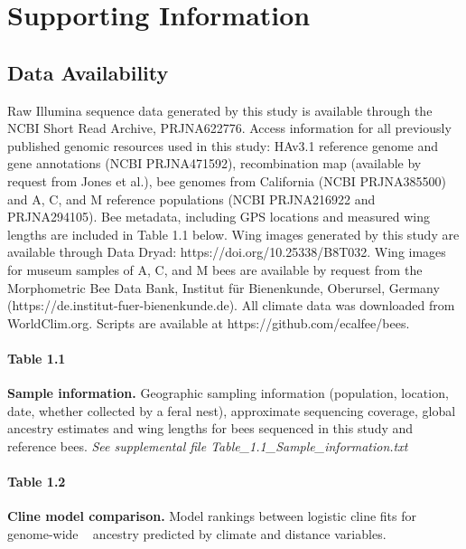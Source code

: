 \medskip

%


%

\newpage
\section*{Supporting Information}

\subsection*{Data Availability}
Raw Illumina sequence data generated by this study is available through the NCBI Short Read Archive, PRJNA622776. Access information for all previously published genomic resources used in this study: HAv3.1 reference genome and gene annotations (NCBI PRJNA471592), recombination map (available by request from Jones et al.), bee genomes from California (NCBI PRJNA385500) and A, C, and M reference populations (NCBI PRJNA216922 and PRJNA294105). Bee metadata, including GPS locations and measured wing lengths are included in Table 1.1 below. Wing images generated by this study are available through Data Dryad: https://doi.org/10.25338/B8T032. Wing images for museum samples of A, C, and M bees are available by request from the Morphometric Bee Data Bank, Institut für Bienenkunde, Oberursel, Germany (https://de.institut-fuer-bienenkunde.de). All climate data was downloaded from WorldClim.org. Scripts are available at https://github.com/ecalfee/bees.

\paragraph*{Table 1.1}
\label{table_bee_gps}
{\bf Sample information.} Geographic sampling information (population, location, date, whether collected by a feral nest), approximate sequencing coverage, global ancestry estimates and wing lengths for bees sequenced in this study and reference bees. \textit{See supplemental file Table\_1.1\_Sample\_information.txt}
\newpage


\paragraph*{Table 1.2}
\label{table_AIC_climate_clines}
{\bf Cline model comparison.} Model rankings between logistic cline fits for genome-wide \scutellata\  ancestry predicted by climate and distance variables.



